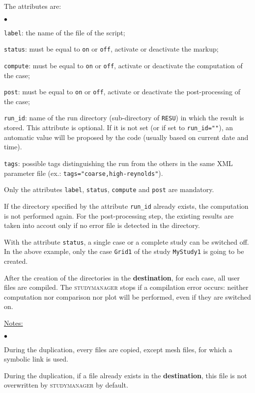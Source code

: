 \documentclass[a4paper,10pt,twoside]{csshortdoc}
\begin{document}
The attributes are:
\begin{list}{$\bullet$}{}
\item \texttt{label}: the name of the file of the script;
\item \texttt{status}: must be equal to \texttt{on} or \texttt{off},
activate or deactivate the markup;
\item \texttt{compute}: must be equal to \texttt{on} or \texttt{off},
activate or deactivate the computation of the case;
\item \texttt{post}: must be equal to \texttt{on} or \texttt{off},
activate or deactivate the post-processing of the case;
\item \texttt{run\_id}: name of the run directory (sub-directory of \texttt{RESU}) in which the result
is stored. This attribute is optional. If it is not set (or if set to \texttt{run\_id=""}), an
automatic value will be proposed by the code (usually based on current date and time).
\item \texttt{tags}: possible tags distinguishing the run from the others in the same XML parameter file (ex.: \texttt{tags="coarse,high-reynolds"}).
\end{list}

Only the attributes \texttt{label}, \texttt{status}, \texttt{compute}
and \texttt{post} are mandatory.

If the directory specified by the attribute \texttt{run\_id} already exists,
the computation is not performed again. For the post-processing step, the existing
results are taken into accout only if no error file is detected in the
directory.

With the attribute \texttt{status}, a single case or a complete study can be
switched off. In the above example, only the case \texttt{Grid1} of the study
\texttt{MyStudy1} is going to be created.

After the creation of the directories in the \textbf{destination}, for each
case, all user files are compiled. The \textsc{studymanager} stops if a compilation
error occurs: neither computation nor comparison nor plot will be performed,
even if they are switched on.

\underline{Notes:}

\begin{list}{$\bullet$}{}
\item During the duplication, every files are copied, except mesh files, for
which a symbolic link is used.
\item During the duplication, if a file already exists in the
\textbf{destination}, this file is not overwritten by \textsc{studymanager} by default.
\end{list}
\end{document}
